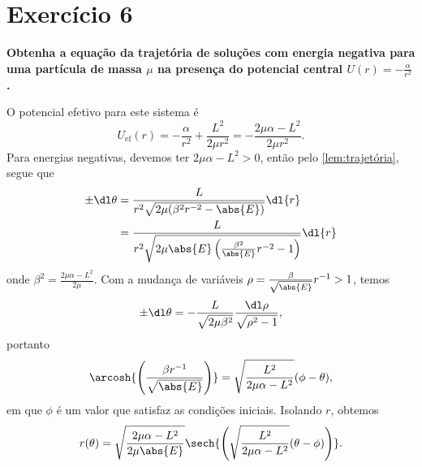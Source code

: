 \section*{Exercício 6}
\textbf{Obtenha a equação da trajetória de soluções com energia negativa para uma partícula de massa \(\mu\) na presença do potencial central \(U(r) = -\frac{\alpha}{r^2}\).}

O potencial efetivo para este sistema é
\begin{equation*}
    U_\mathrm{ef}(r) = -\frac{\alpha}{r^2} + \frac{L^2}{2\mu r^2} = -\frac{2\mu\alpha - L^2}{2\mu r^2}.
\end{equation*}
Para energias negativas, devemos ter \(2\mu\alpha - L^2 > 0\), então pelo \cref{lem:trajetória}, segue que
\begin{align*}
    \pm \dl\theta &= \frac{L}{r^2\sqrt{2\mu(\beta^2 r^{-2}-\abs{E})}}\dl{r}\\
                  &= \frac{L}{r^2\sqrt{2\mu\abs{E}\left(\frac{\beta^2}{\abs{E}} r^{-2}-1\right)}}\dl{r}
\end{align*}
onde \(\beta^2 = \frac{2\mu \alpha - L^2}{2\mu}\). Com a mudança de variáveis \(\rho = \frac{\beta}{\sqrt{\abs{E}}} r^{-1} > 1\), temos
\begin{equation*}
    \pm \dl\theta = -\frac{L}{\sqrt{2\mu\beta^2}} \frac{\dl\rho}{\sqrt{\rho^2 - 1}},
\end{equation*}
portanto
\begin{equation*}
    \arcosh{\left(\frac{\beta r^{-1}}{\sqrt{\abs{E}}}\right)} = \sqrt{\frac{L^2}{2\mu \alpha - L^2}}(\phi - \theta),
\end{equation*}
em que \(\phi\) é um valor que satisfaz as condições iniciais. Isolando \(r\), obtemos
\begin{equation*}
    r(\theta) = \sqrt{\frac{2\mu \alpha - L^2}{2\mu\abs{E}}}\sech{\left(\sqrt{\frac{L^2}{2\mu \alpha - L^2}}(\theta - \phi)\right)}.
\end{equation*}
